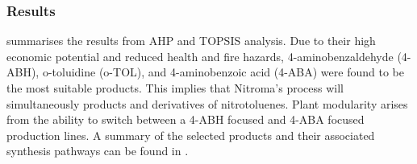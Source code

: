 


\subsubsection{Results}
 summarises the results from AHP and TOPSIS analysis.   
Due to their high economic potential and reduced health and fire hazards, 4-aminobenzaldehyde (4-ABH), o-toluidine (o-TOL), and 4-aminobenzoic acid (4-ABA) were found to be the most suitable products. This implies that Nitroma's process will simultaneously products \ortho and \para derivatives of nitrotoluenes. Plant modularity arises from the ability to switch between a 4-ABH focused and 4-ABA focused production lines. A summary of the selected products and their associated synthesis pathways can be found in .

